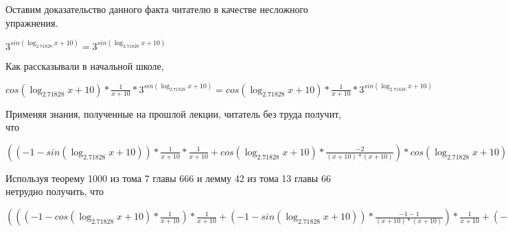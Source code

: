 \documentclass[12pt,a4paper,fleqn]{article}
\theoremstyle{definition}
\begin{document}
Оставим доказательство данного факта читателю в качестве несложного упражнения. 

${ 3 }^{sin(\log_{ 2.71828 }{ x  +  10 })} = { 3 }^{sin(\log_{ 2.71828 }{ x  +  10 })}$

Как рассказывали в начальной школе, 

$cos(\log_{ 2.71828 }{ x  +  10 }) * \frac{ 1 }{ x  +  10 }
 * { 3 }^{sin(\log_{ 2.71828 }{ x  +  10 })} = cos(\log_{ 2.71828 }{ x  +  10 }) * \frac{ 1 }{ x  +  10 }
 * { 3 }^{sin(\log_{ 2.71828 }{ x  +  10 })}$

Применяя знания, полученные на прошлой лекции, читатель без труда получит, что 

$(( -1  - sin(\log_{ 2.71828 }{ x  +  10 })) * \frac{ 1 }{ x  +  10 }
 * \frac{ 1 }{ x  +  10 }
 + cos(\log_{ 2.71828 }{ x  +  10 }) * \frac{ -2 }{( x  +  10 ) * ( x  +  10 )}
) * cos(\log_{ 2.71828 }{ x  +  10 }) * \frac{ 1 }{ x  +  10 }
 * { 3 }^{sin(\log_{ 2.71828 }{ x  +  10 })} = (( -1  - sin(\log_{ 2.71828 }{ x  +  10 })) * \frac{ 1 }{ x  +  10 }
 * \frac{ 1 }{ x  +  10 }
 + cos(\log_{ 2.71828 }{ x  +  10 }) * \frac{ -2 }{( x  +  10 ) * ( x  +  10 )}
) * cos(\log_{ 2.71828 }{ x  +  10 }) * \frac{ 1 }{ x  +  10 }
 * { 3 }^{sin(\log_{ 2.71828 }{ x  +  10 })}$

Используя теорему 1000 из тома 7 главы 666 и лемму 42 из тома 13 главы 66 нетрудно получить, что 

$((( -1  - cos(\log_{ 2.71828 }{ x  +  10 }) * \frac{ 1 }{ x  +  10 }
) * \frac{ 1 }{ x  +  10 }
 + ( -1  - sin(\log_{ 2.71828 }{ x  +  10 })) * \frac{ -1  -  1 }{( x  +  10 ) * ( x  +  10 )}
) * \frac{ 1 }{ x  +  10 }
 + ( -1  - sin(\log_{ 2.71828 }{ x  +  10 })) * \frac{ 1 }{ x  +  10 }
 * \frac{ -1  -  1 }{( x  +  10 ) * ( x  +  10 )}
 + ( -1  - sin(\log_{ 2.71828 }{ x  +  10 })) * \frac{ 1 }{ x  +  10 }
 * \frac{ -2 }{( x  +  10 ) * ( x  +  10 )}
 + cos(\log_{ 2.71828 }{ x  +  10 }) * \frac{ -1  -  -2  * ( x  +  10  +  x  +  10 )}{( x  +  10 ) * ( x  +  10 ) * ( x  +  10 ) * ( x  +  10 )}
) * { 3 }^{sin(\log_{ 2.71828 }{ x  +  10 })} + (( -1  - sin(\log_{ 2.71828 }{ x  +  10 })) * \frac{ 1 }{ x  +  10 }
 * \frac{ 1 }{ x  +  10 }
 + cos(\log_{ 2.71828 }{ x  +  10 }) * \frac{ -2 }{( x  +  10 ) * ( x  +  10 )}
) * cos(\log_{ 2.71828 }{ x  +  10 }) * \frac{ 1 }{ x  +  10 }
 * { 3 }^{sin(\log_{ 2.71828 }{ x  +  10 })} = ((( -1  - cos(\log_{ 2.71828 }{ x  +  10 }) * \frac{ 1 }{ x  +  10 }
) * \frac{ 1 }{ x  +  10 }
 + ( -1  - sin(\log_{ 2.71828 }{ x  +  10 })) * \frac{ -1  -  1 }{( x  +  10 ) * ( x  +  10 )}
) * \frac{ 1 }{ x  +  10 }
 + ( -1  - sin(\log_{ 2.71828 }{ x  +  10 })) * \frac{ 1 }{ x  +  10 }
 * \frac{ -1  -  1 }{( x  +  10 ) * ( x  +  10 )}
 + ( -1  - sin(\log_{ 2.71828 }{ x  +  10 })) * \frac{ 1 }{ x  +  10 }
 * \frac{ -2 }{( x  +  10 ) * ( x  +  10 )}
 + cos(\log_{ 2.71828 }{ x  +  10 }) * \frac{ -1  -  -2  * ( x  +  10  +  x  +  10 )}{( x  +  10 ) * ( x  +  10 ) * ( x  +  10 ) * ( x  +  10 )}
) * { 3 }^{sin(\log_{ 2.71828 }{ x  +  10 })} + (( -1  - sin(\log_{ 2.71828 }{ x  +  10 })) * \frac{ 1 }{ x  +  10 }
 * \frac{ 1 }{ x  +  10 }
 + cos(\log_{ 2.71828 }{ x  +  10 }) * \frac{ -2 }{( x  +  10 ) * ( x  +  10 )}
) * cos(\log_{ 2.71828 }{ x  +  10 }) * \frac{ 1 }{ x  +  10 }
 * { 3 }^{sin(\log_{ 2.71828 }{ x  +  10 })}$
\end{document}
